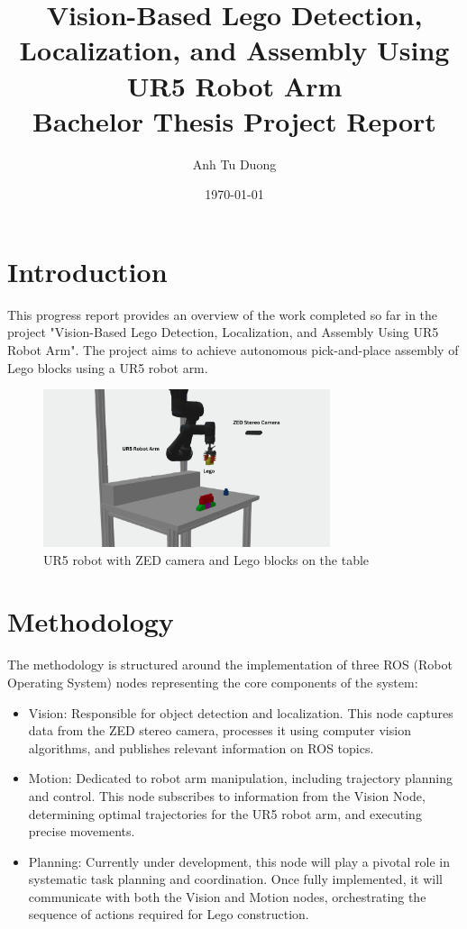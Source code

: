 \documentclass{article}
\title{Vision-Based Lego Detection, Localization, and Assembly Using UR5 Robot Arm\\
\large Bachelor Thesis Project Report}
\author{Anh Tu Duong}
\date{\today}
\begin{document}
	
	\maketitle
	
	\section{Introduction}
	This progress report provides an overview of the work completed so far in the project "Vision-Based Lego Detection, Localization, and Assembly Using UR5 Robot Arm". The project aims to achieve autonomous pick-and-place assembly of Lego blocks using a UR5 robot arm.
	
	\begin{figure}[H]
		\centering
		\includegraphics[width=0.75\textwidth]{images/scene-start.png}
		\caption{UR5 robot with ZED camera and Lego blocks on the table}
		\label{fig:scene-start}
	\end{figure}
	
	\section{Methodology}
	The methodology is structured around the implementation of three ROS (Robot Operating System) nodes representing the core components of the system:
	\begin{itemize}
		\item Vision: Responsible for object detection and localization. This node captures data from the ZED stereo camera, processes it using computer vision algorithms, and publishes relevant information on ROS topics.
		\item Motion: Dedicated to robot arm manipulation, including trajectory planning and control. This node subscribes to information from the Vision Node, determining optimal trajectories for the UR5 robot arm, and executing precise movements.
		\item Planning: Currently under development, this node will play a pivotal role in systematic task planning and coordination. Once fully implemented, it will communicate with both the Vision and Motion nodes, orchestrating the sequence of actions required for Lego construction.
	\end{itemize}
	
\end{document}
